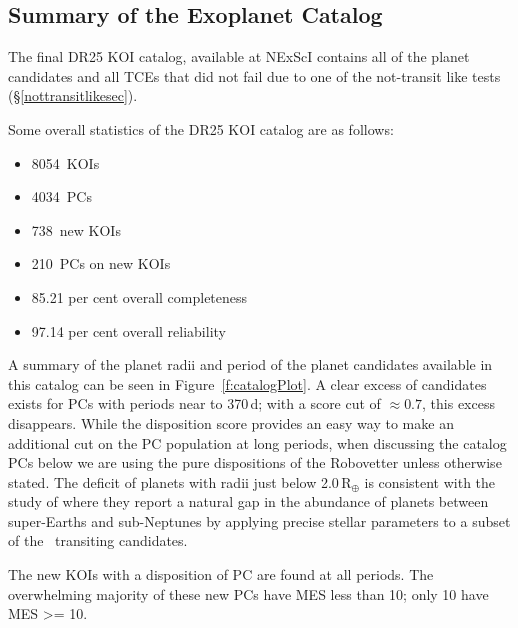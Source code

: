 \def \nkois {8054}
\def \ncand {4034}
\def \newkois {738}
\def \newcand {210}
\def \completeness {85.21}
\def \reliability {97.14}

\subsection{Summary of the Exoplanet Catalog}

The final DR25 KOI catalog, available at NExScI contains all of the planet candidates and all TCEs that did not fail due to one of the not-transit like tests (\S\ref{nottransitlikesec}). 


Some overall statistics of the DR25 KOI catalog are as follows:
\begin{itemize}
    \item \nkois{}~KOIs
    \item \ncand{}~PCs
    \item \newkois{}~new KOIs
    \item \newcand{}~PCs on new KOIs
    \item \completeness{} per cent overall completeness
    \item \reliability{} per cent overall reliability
\end{itemize}

A summary of the planet radii and period of the planet candidates available in this catalog can be seen in Figure~\ref{f:catalogPlot}. A clear excess of candidates exists for PCs with periods near to 370\,d;  with a score cut of $\approx0.7$, this excess disappears. While the disposition score provides an easy way to make an additional cut on the PC population at long periods, when discussing the catalog PCs below we are using the pure dispositions of the Robovetter unless otherwise stated. The deficit of planets with radii just below 2.0\,R$_{\oplus}$ is consistent with the study of \citet{Fulton2017} where they report a natural gap in the abundance of planets between super-Earths and sub-Neptunes by applying precise stellar parameters to a subset of the \kepler\ transiting candidates. 

The new KOIs with a disposition of PC are found at all periods. The overwhelming majority of these new PCs have MES less than 10; only 10 have MES >= 10. 

